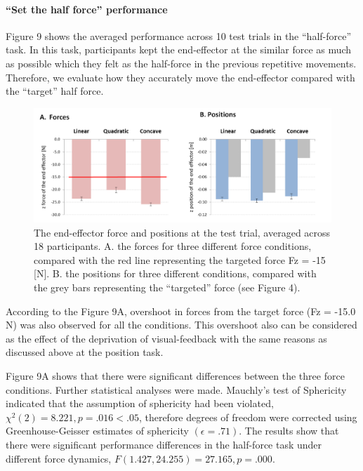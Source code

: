 \paragraph{“Set the half force” performance}
Figure 9 shows the averaged performance across 10 test trials in the “half-force” task. In this task, participants kept the end-effector at the similar force as much as possible which they felt as the half-force in the previous repetitive movements. Therefore, we evaluate how they accurately move the end-effector compared with the “target” half force. 
%
\begin{figure}
  \centering
  \includegraphics[scale=0.5]{Chie/figs/Figure9.png}
  \caption{The end-effector force and positions at the test trial, averaged across 18 participants. 
A. the forces for three different force conditions, compared with the red line representing the targeted force Fz = -15 [N].  B. the positions for three different conditions, compared with the grey bars representing the “targeted” force (see Figure 4).}
  \label{half-force}
\end{figure}
According to the Figure 9A, overshoot in forces  from the target force (Fz = -15.0 N) was also observed for  all the conditions. This overshoot also can be considered as the effect of the deprivation of visual-feedback with the same reasons as discussed above at the position task.

Figure 9A shows that there were significant differences between the three force conditions. Further statistical analyses were made. Mauchly’s test of Sphericity indicated that the assumption of sphericity had been violated, $χ^2 (2) = 8.221, p = .016 < .05$, therefore degrees of freedom were corrected using Greenhouse-Geisser estimates of sphericity $(\epsilon = .71)$. The results show that there were significant performance differences in the half-force task under different force dynamics, $F(1.427, 24.255) = 27.165, p = .000$.

